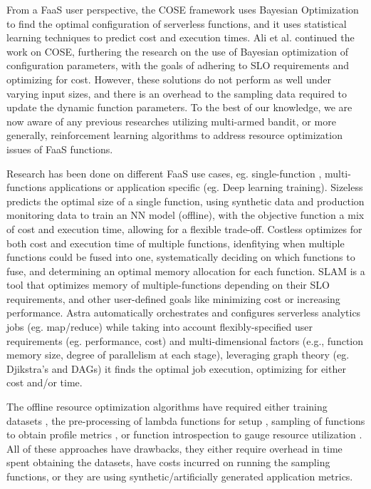 \documentclass[conference]{IEEEtran}
\begin{document}
From a FaaS user perspective, the COSE \cite{9155363} framework uses Bayesian Optimization to find the optimal configuration of serverless functions, and it uses statistical learning techniques to predict cost and execution times. Ali et al. \cite{10063937} continued the work on COSE, furthering the research on the use of Bayesian optimization of configuration parameters, with the goals of adhering to SLO requirements and optimizing for cost. However, these solutions do not perform as well under varying input sizes, and there is an overhead to the sampling data required to update the dynamic function parameters. To the best of our knowledge, we are now aware of any previous researches utilizing multi-armed bandit, or more generally, reinforcement learning algorithms to address resource optimization issues of FaaS functions. 

Research has been done on different FaaS use cases, eg. single-function \cite{10.1145/3429880.3430099, 9946331, 9881584}, multi-functions applications \cite{s23187829, 8567674} or application specific \cite{9826021} (eg. Deep learning training). Sizeless \cite{10.1145/3464298.3493398} predicts the optimal size of a single function, using synthetic data and production monitoring data to train an NN model (offline), with the objective function a mix of cost and execution time, allowing for a flexible trade-off. Costless \cite {8567674} optimizes for both cost and execution time of multiple functions, idenfitying when multiple functions could be fused into one, systematically deciding on which functions to fuse, and determining an optimal memory allocation for each function. SLAM \cite{9860980} is a tool that optimizes memory of multiple-functions depending on their SLO requirements, and other user-defined goals like minimizing cost or increasing performance. Astra \cite{9460548} automatically orchestrates and configures serverless analytics jobs (eg. map/reduce) while taking into account flexibly-specified user requirements (eg. performance, cost) and multi-dimensional factors (e.g., function memory size, degree of parallelism at each stage), leveraging graph theory (eg. Djikstra's and DAGs) it finds the optimal job execution, optimizing for either cost and/or time.

The offline resource optimization algorithms have required either training datasets \cite{10.1145/3464298.3493398, 10.1145/3542929.3563468}, the pre-processing of lambda functions for setup \cite{10.1109/INFOCOM48880.2022.9796962, 8567674}, sampling of functions to obtain profile metrics \cite{10.1145/3542929.3563464}, or function introspection to gauge resource utilization \cite{s23187829, 9336272}. All of these approaches have drawbacks, they either require overhead in time spent obtaining the datasets, have costs incurred on running the sampling functions, or they are using synthetic/artificially generated application metrics.
\end{document}
